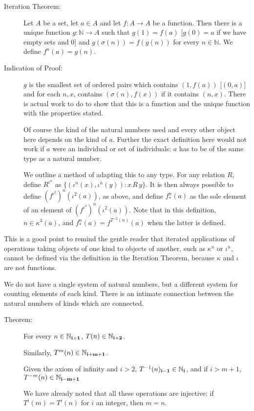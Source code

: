 \documentclass[12pt]{article}
\begin{document}
\begin{description}

\item[Iteration Theorem:]  Let $A$ be a set, let $a \in A$ and let $f:A \rightarrow A$ be a function.
Then there is a unique function $g:\mathbb N \rightarrow A$ such that $g(1) = f(a)$ [$g(0) = a$ if we have empty sets and 0]  and $g(\sigma(n)) = f(g(n))$ for every  $n \in \mathbb N$.  We define $f^n(a) = g(n)$.

\item[Indication of Proof:]  $g$ is the smallest set of ordered pairs which contains $(1,f(a))$ [$(0,a)$] and for each $n,x$, contains $(\sigma(n),f(x))$ if it contains $(n,x)$.  There is actual work to do to show that this is a function and the unique function with the properties stated.

Of course the kind of the natural numbers used  and every other object here depends on the kind of $a$.  Further the exact definition here would not work if $a$ were an individual or set of individuals:  $a$ has to be of the same type as a natural number.  

We outline a method of adapting this to any type.  For any relation $R$, define $R^{\iota^n}$ as $\{(\iota^n(x),\iota^n(y)):x \, R \, y\}$.   It is then always possible to define $(f^{\iota^2})^n(\iota^2(a))$, as above,
and define  $f^n_*(a)$ as the sole element of an element of $(f^{\iota^2})^n(\iota^2(a))$.  Note that in this definition, $n \in \kappa^3(a)$, and $f^n_*(a) = f^{T^{-2}(n)}(a)$ when the latter is defined.

\end{description}

This is a good point to remind the gentle reader that iterated applications of operations taking objects of one kind to objects of another, such as $\kappa^n$ or $\iota^n$, cannot be defined via the definition in the Iteration Theorem, because $\kappa$ and $\iota$ are not functions.

We do not have a single system of natural numbers, but a different system for counting elements of each kind.
There is an intimate connection between the natural numbers of kinds which are connected.

\begin{description}

\item[Theorem:]  For every $n \in {\mathbb N}_{\bf i+1}$, $T(n) \in {\mathbb N}_{\bf i+2}$.

Similarly, $T^m(n) \in {\mathbb N}_{\bf i+m+1}$.

Given the axiom of infinity and $i>2$, $T^{-1}(n)_{\bf i-1} \in {\mathbb N}_{\bf i}$, and if $i>m+1$,
$T^{-m}(n) \in {\mathbb N}_{\bf i-m+1}$

We have already noted that all these operations are injective:  if $T^i(m)=T^i(n)$ for $i$ an integer, then $m=n$.

\end{description}
\end{document}

